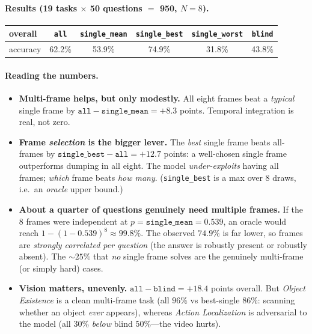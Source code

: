 \documentclass[11pt]{article}
\begin{document}
\paragraph{Results (19 tasks $\times$ 50 questions $=$ 950, $N{=}8$).}

\begin{center}
\begin{tabular}{lccccc}
\toprule
overall & \texttt{all} & \texttt{single\_mean} & \texttt{single\_best} & \texttt{single\_worst} & \texttt{blind} \\
\midrule
accuracy & 62.2\% & 53.9\% & 74.9\% & 31.8\% & 43.8\% \\
\bottomrule
\end{tabular}
\end{center}

\paragraph{Reading the numbers.}
\begin{itemize}
\item \textbf{Multi-frame helps, but only modestly.} All eight frames beat a
      \emph{typical} single frame by $\texttt{all}-\texttt{single\_mean}=+8.3$ points.
      Temporal integration is real, not zero.
\item \textbf{Frame \emph{selection} is the bigger lever.} The \emph{best} single
      frame beats all-frames by $\texttt{single\_best}-\texttt{all}=+12.7$ points: a
      well-chosen single frame outperforms dumping in all eight. The model
      \emph{under-exploits} having all frames; \emph{which} frame beats \emph{how
      many}. (\texttt{single\_best} is a max over 8 draws, i.e.\ an \emph{oracle}
      upper bound.)
\item \textbf{About a quarter of questions genuinely need multiple frames.} If the 8
      frames were independent at $p=\texttt{single\_mean}=0.539$, an oracle would reach
      $1-(1-0.539)^8\approx99.8\%$. The observed $74.9\%$ is far lower, so frames are
      \emph{strongly correlated per question} (the answer is robustly present or
      robustly absent). The $\sim25\%$ that \emph{no} single frame solves are the
      genuinely multi-frame (or simply hard) cases.
\item \textbf{Vision matters, unevenly.} $\texttt{all}-\texttt{blind}=+18.4$ points
      overall. But \emph{Object Existence} is a clean multi-frame task (all $96\%$ vs
      best-single $86\%$: scanning whether an object \emph{ever} appears), whereas
      \emph{Action Localization} is adversarial to the model (all $30\%$ \emph{below}
      blind $50\%$---the video hurts).
\end{itemize}
\end{document}

